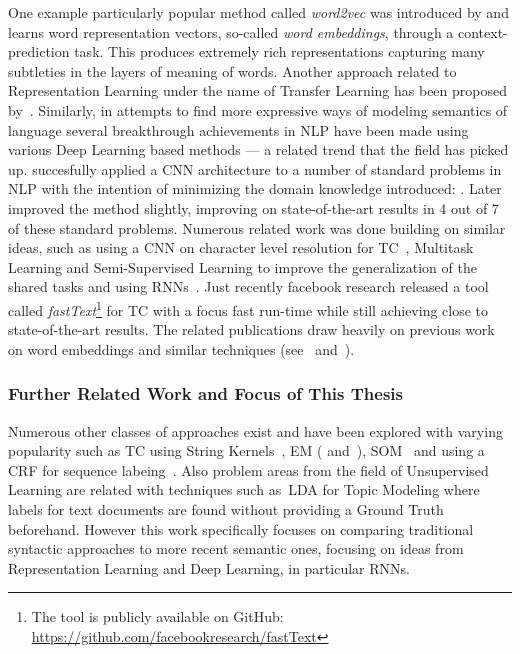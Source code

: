 One example particularly popular method called \emph{word2vec} was introduced by \cite{Mikolov:2013ad} and learns word representation vectors, so-called \emph{word embeddings}, through a context-prediction task. This produces extremely rich representations capturing many subtleties in the layers of meaning of words\cite{Mikolov:2013ab}. Another approach related to \gls{Representation Learning} under the name of Transfer Learning has been proposed by~\cite{Do:2006aa}. Similarly, in attempts to find more expressive ways of modeling semantics of language several breakthrough achievements in \acrshort{NLP} have been made using various \gls{Deep Learning} based methods --- a related trend that the field has picked up.
\cite{Collobert:2011aa} succesfully applied a \acrfull{CNN} architecture to a number of standard problems in \gls{NLP} with the intention of minimizing the domain knowledge introduced: .
Later~\cite{Kim:2014aa} improved the method slightly, improving on state-of-the-art results in 4 out of 7 of these standard problems. Numerous related work was done building on similar ideas, such as using a \acrshort{CNN} on character level resolution for \gls{TC}~\cite{Zhang:2015aa}, Multitask Learning and Semi-Supervised Learning to improve the generalization of the shared tasks\cite{Collobert:2008aa} and using \glspl{RNN}~\cite{Liu:2016aa}. Just recently facebook research released a tool called \emph{fastText}\footnote{The tool is publicly available on \gls{GitHub}: \url{https://github.com/facebookresearch/fastText}} for \gls{TC} with a focus fast run-time while still achieving close to state-of-the-art results. The related publications draw heavily on previous work on word embeddings and similar techniques (see~\cite{Joulin:2016aa} and~\cite{Bojanowski:2016aa}).

\subsubsection*{Further Related Work and Focus of This Thesis}
\label{subs:Further Related Work and Focus of This Thesis}

Numerous other classes of approaches exist and have been explored with varying popularity such as \gls{TC} using String Kernels~\cite{Lodhi:2002aa}, \gls{EM} (\cite{Nigam:2000aa} and~\cite{McCallum:1999aa}), \gls{SOM}~\cite{Merkl:1998aa} and using a \gls{CRF} for sequence labeing~\cite{Lafferty:2001aa}.
Also problem areas from the field of \gls{Unsupervised Learning} are related with techniques such as~\gls{LDA} \cite{Blei:2003aa} for \gls{Topic Modeling} where labels for text documents are found without providing a \gls{Ground Truth} beforehand. However this work specifically focuses on comparing traditional syntactic approaches to more recent semantic ones, focusing on ideas from \gls{Representation Learning} and \gls{Deep Learning}, in particular \glspl{RNN}.

